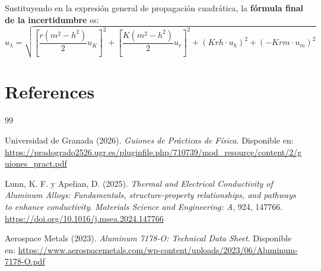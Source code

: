 \documentclass[a4paper,11pt]{article}
\begin{document}
Sustituyendo en la expresión general de propagación cuadrática, la \textbf{fórmula final de la incertidumbre} es:
\begin{equation}
    u_\lambda = \sqrt{ \left[ \frac{r(m^2 - h^2)}{2} u_K \right]^2 + \left[ \frac{K(m^2 - h^2)}{2} u_r \right]^2 + \left( K r h \cdot u_h \right)^2 + \left( -K r m \cdot u_m \right)^2 }
\end{equation}


\newpage
\section{References}

\begin{thebibliography}{99}
    
     Universidad de Granada (2026). \textit{Guiones de Prácticas de Física}. Disponible en: \url{https://pradogrado2526.ugr.es/pluginfile.php/710739/mod_resource/content/2/guiones_pract.pdf}

     Lunn, K. F. y Apelian, D. (2025). \textit{Thermal and Electrical Conductivity of Aluminum Alloys: Fundamentals, structure-property relationships, and pathways to enhance conductivity}. \textit{Materials Science and Engineering: A}, 924, 147766. \url{https://doi.org/10.1016/j.msea.2024.147766}
    
     Aerospace Metals (2023). \textit{Aluminum 7178-O: Technical Data Sheet}. Disponible en: \url{https://www.aerospacemetals.com/wp-content/uploads/2023/06/Aluminum-7178-O.pdf}
    
\end{thebibliography}
\end{document}
